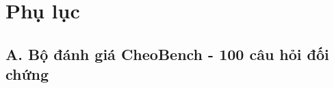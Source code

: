%
%

\chapter*{Phụ lục}

\section*{A. Bộ đánh giá CheoBench - 100 câu hỏi đối chứng}
\label{appendix:cheobench}

